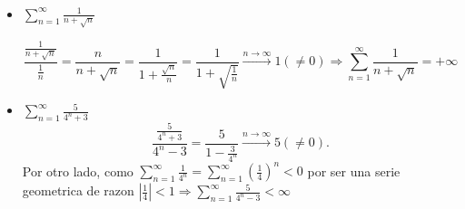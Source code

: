 \begin{example}
	~\begin{itemize}
		\item \(\sum_{n =1}^{\infty} \frac{1}{n + \sqrt{n } }\)

		      \[
			      \frac{\frac{1 }{n + \sqrt{n } }}{\frac{1}{n }} = \frac{n }{n + \sqrt{n } } = \frac{1}{1 + \frac{\sqrt{n } }{n }} = \frac{1}{1 + \sqrt{\frac{1}{n }} } \overset{n\rightarrow \infty}{\longrightarrow} 1 (\neq 0) \Rightarrow \sum_{n =1}^{\infty} \frac{1}{n+\sqrt{n} } = + \infty
		      \]
		\item \(\sum_{n =1}^{\infty} \frac{5}{4^{n} + 3 }\)
		      \[
			      \frac{\frac{5}{4^{n} + 3 }}{4^{n} -3 } = \frac{5}{1 - \frac{3}{4^{n} }} \overset{n\rightarrow \infty}{\longrightarrow} 5 (\neq 0).
		      \]
		      Por otro lado, como \(\sum_{n =1}^{\infty} \frac{1}{4^{n} } = \sum_{n =1}^{\infty} \left (\frac{1}{4} \right)^{n} < 0\) por ser una serie geometrica de razon \( \left\vert \frac{1}{4} \right\vert  < 1 \Rightarrow \sum_{n =1}^{\infty} \frac{5}{4^{n} - 3 } < \infty\)
	\end{itemize}
\end{example}
